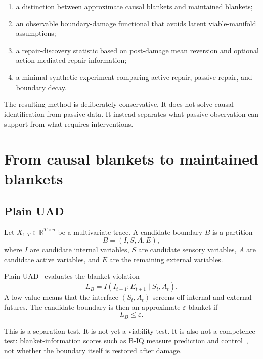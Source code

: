 \documentclass[11pt]{article}
\newcommand{\MI}{I}
\newcommand{\given}{\mid}
\begin{document}
\begin{enumerate}[label=(\roman*)]
  \item a distinction between approximate causal blankets and maintained blankets;
  \item an observable boundary-damage functional that avoids latent viable-manifold assumptions;
  \item a repair-discovery statistic based on post-damage mean reversion and optional action-mediated repair information;
  \item a minimal synthetic experiment comparing active repair, passive repair, and boundary decay.
\end{enumerate}

The resulting method is deliberately conservative. It does not solve causal identification from passive data. It instead separates what passive observation can support from what requires interventions.

\section{From causal blankets to maintained blankets}

\subsection{Plain UAD}

Let $X_{1:T}\in\mathbb{R}^{T\times n}$ be a multivariate trace. A candidate boundary $B$ is a partition
\begin{equation}
  B = (I,S,A,E),
\end{equation}
where $I$ are candidate internal variables, $S$ are candidate sensory variables, $A$ are candidate active variables, and $E$ are the remaining external variables.

Plain UAD~\cite{uad2025} evaluates the blanket violation
\begin{equation}
  L_B
  =
  \MI(I_{t+1};E_{t+1}\given S_t,A_t).
  \label{eq:plain-uad}
\end{equation}
A low value means that the interface $(S_t,A_t)$ screens off internal and external futures. The candidate boundary is then an approximate $\varepsilon$-blanket if
\begin{equation}
  L_B \leq \varepsilon.
\end{equation}

This is a separation test. It is not yet a viability test. It is also not a competence test: blanket-information scores such as B-IQ measure prediction and control~\cite{biq2025}, not whether the boundary itself is restored after damage.
\end{document}

